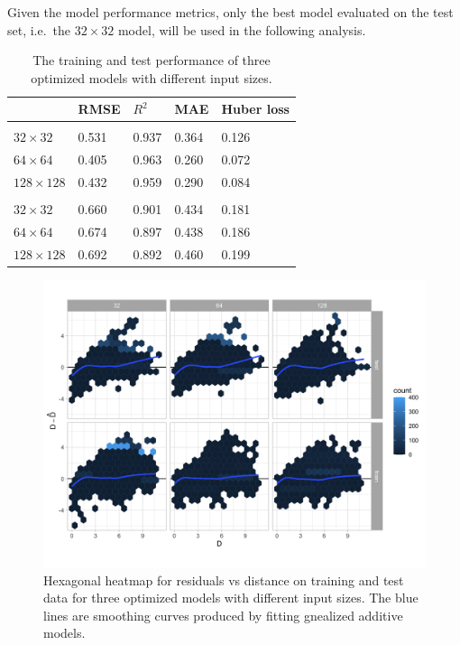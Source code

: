 \documentclass[]{interact}
\theoremstyle{plain}%
\theoremstyle{definition}
\theoremstyle{remark}
\begin{document}
Given the model performance metrics, only the best model evaluated on
the test set, i.e.~the \(32 \times 32\) model, will be used in the
following analysis.

\begin{table}

\caption{\label{tab:performance}The training and test performance of three optimized models with different input sizes.}
\centering
\begin{tabular}[t]{lllll}
\toprule
 & RMSE & $R^2$ & MAE & Huber loss\\
\midrule
\addlinespace[0.3em]
\multicolumn{5}{l}{\textbf{Training set}}\\
\hspace{1em}$32 \times 32$ & 0.531 & 0.937 & 0.364 & 0.126\\
\hspace{1em}$64 \times 64$ & 0.405 & 0.963 & 0.260 & 0.072\\
\hspace{1em}$128 \times 128$ & 0.432 & 0.959 & 0.290 & 0.084\\
\addlinespace[0.3em]
\multicolumn{5}{l}{\textbf{Test set}}\\
\hspace{1em}$32 \times 32$ & 0.660 & 0.901 & 0.434 & 0.181\\
\hspace{1em}$64 \times 64$ & 0.674 & 0.897 & 0.438 & 0.186\\
\hspace{1em}$128 \times 128$ & 0.692 & 0.892 & 0.460 & 0.199\\
\bottomrule
\end{tabular}
\end{table}

\begin{figure}

{\centering \includegraphics[width=1\linewidth]{paper_files/figure-latex/model-performance-1} 

}

\caption{Hexagonal heatmap for residuals vs distance on training and test data for three optimized models with different input sizes. The blue lines are smoothing curves produced by fitting gnealized additive models.}\label{fig:model-performance}
\end{figure}
\end{document}
